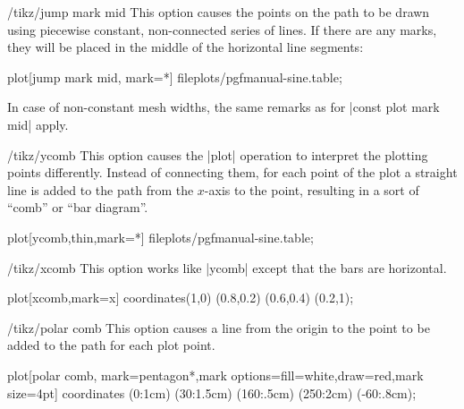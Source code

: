 \begin{key}{/tikz/jump mark mid}
    This option causes the points on the path to be drawn using piecewise
    constant, non-connected series of lines. If there are any marks, they will
    be placed in the middle of the horizontal line segments:
\begin{codeexample}[]
\tikz\draw plot[jump mark mid, mark=*] file{plots/pgfmanual-sine.table};
\end{codeexample}

    In case of non-constant mesh widths, the same remarks as for
    |const plot mark mid| apply.
\end{key}

\begin{key}{/tikz/ycomb}
    This option causes the |plot| operation to interpret the plotting points
    differently. Instead of connecting them, for each point of the plot a
    straight line is added to the path from the $x$-axis to the point,
    resulting in a sort of ``comb'' or ``bar diagram''.
\begin{codeexample}[]
\tikz{} plot[ycomb,thin,mark=*] file{plots/pgfmanual-sine.table};
\end{codeexample}

\begin{codeexample}[]
\end{codeexample}
\end{key}

\begin{key}{/tikz/xcomb}
    This option works like |ycomb| except that the bars are horizontal.
\begin{codeexample}[]
\tikz \draw plot[xcomb,mark=x] coordinates{(1,0) (0.8,0.2) (0.6,0.4) (0.2,1)};
\end{codeexample}
\end{key}

\begin{key}{/tikz/polar comb}
    This option causes a line from the origin to the point to be added to the
    path for each plot point.
\begin{codeexample}[]
\tikz \draw plot[polar comb,
     mark=pentagon*,mark options={fill=white,draw=red},mark size=4pt]
   coordinates {(0:1cm) (30:1.5cm) (160:.5cm) (250:2cm) (-60:.8cm)};
\end{codeexample}
\end{key}

